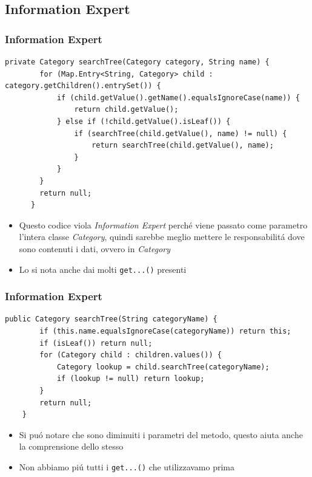 \subsection{Information Expert}
    \begin{frame} [fragile]
      \frametitle{Information Expert}
        \begin{lstlisting}[autogobble, title={\texttt{CategoryController.java}}]
            private Category searchTree(Category category, String name) {
        for (Map.Entry<String, Category> child : category.getChildren().entrySet()) {
            if (child.getValue().getName().equalsIgnoreCase(name)) {
                return child.getValue();
            } else if (!child.getValue().isLeaf()) {
                if (searchTree(child.getValue(), name) != null) {
                    return searchTree(child.getValue(), name);
                }
            }
        }
        return null;
      }
        \end{lstlisting}
      \begin{itemize}
          \item Questo codice viola \emph{Information Expert} perché
          viene passato come parametro l'intera classe \emph{Category}, quindi sarebbe meglio
          mettere le responsabilitá dove sono contenuti i dati, ovvero in \emph{Category}
          \item Lo si nota anche dai molti \texttt{get...()} presenti
      \end{itemize}
    \end{frame}

\begin{frame} [fragile]
    \frametitle{Information Expert}
    \begin{lstlisting}[autogobble, title={\texttt{Category.java}}]
        public Category searchTree(String categoryName) {
        if (this.name.equalsIgnoreCase(categoryName)) return this;
        if (isLeaf()) return null;
        for (Category child : children.values()) {
            Category lookup = child.searchTree(categoryName);
            if (lookup != null) return lookup;
        }
        return null;
    }
    \end{lstlisting}
    \begin{itemize}
        \item Si puó notare che sono diminuiti i parametri del metodo, questo aiuta anche la comprensione dello stesso
        \item Non abbiamo piú tutti i \texttt{get...()} che utilizzavamo prima
    \end{itemize}
\end{frame}
